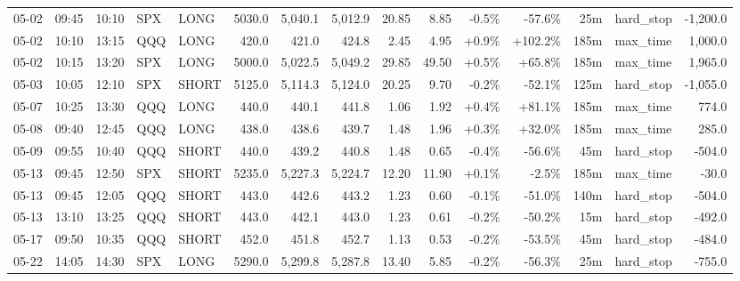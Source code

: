 \documentclass[11pt,a4paper,twoside]{article}
\begin{document}
\begin{landscape}
\begin{center}
\begin{longtable}{>{\color{txtmain}}l l l l l r r r r r r r r >{\color{txtmain}}l r}
05-02 & 09:45 & 10:10 & SPX & LONG & 5030.0 & 5,040.1 & 5,012.9 & 20.85 & 8.85 & \textcolor{lossred}{-0.5\%} & \textcolor{lossred}{-57.6\%} & 25m & hard\_stop & \textcolor{lossred}{-1,200.0} \\
05-02 & 10:10 & 13:15 & QQQ & LONG & 420.0 & 421.0 & 424.8 & 2.45 & 4.95 & \textcolor{wingreen}{+0.9\%} & \textcolor{wingreen}{+102.2\%} & 185m & max\_time & \textcolor{wingreen}{1,000.0} \\
05-02 & 10:15 & 13:20 & SPX & LONG & 5000.0 & 5,022.5 & 5,049.2 & 29.85 & 49.50 & \textcolor{wingreen}{+0.5\%} & \textcolor{wingreen}{+65.8\%} & 185m & max\_time & \textcolor{wingreen}{1,965.0} \\
05-03 & 10:05 & 12:10 & SPX & SHORT & 5125.0 & 5,114.3 & 5,124.0 & 20.25 & 9.70 & \textcolor{lossred}{-0.2\%} & \textcolor{lossred}{-52.1\%} & 125m & hard\_stop & \textcolor{lossred}{-1,055.0} \\
05-07 & 10:25 & 13:30 & QQQ & LONG & 440.0 & 440.1 & 441.8 & 1.06 & 1.92 & \textcolor{wingreen}{+0.4\%} & \textcolor{wingreen}{+81.1\%} & 185m & max\_time & \textcolor{wingreen}{774.0} \\
05-08 & 09:40 & 12:45 & QQQ & LONG & 438.0 & 438.6 & 439.7 & 1.48 & 1.96 & \textcolor{wingreen}{+0.3\%} & \textcolor{wingreen}{+32.0\%} & 185m & max\_time & \textcolor{wingreen}{285.0} \\
05-09 & 09:55 & 10:40 & QQQ & SHORT & 440.0 & 439.2 & 440.8 & 1.48 & 0.65 & \textcolor{lossred}{-0.4\%} & \textcolor{lossred}{-56.6\%} & 45m & hard\_stop & \textcolor{lossred}{-504.0} \\
05-13 & 09:45 & 12:50 & SPX & SHORT & 5235.0 & 5,227.3 & 5,224.7 & 12.20 & 11.90 & \textcolor{wingreen}{+0.1\%} & \textcolor{lossred}{-2.5\%} & 185m & max\_time & \textcolor{lossred}{-30.0} \\
05-13 & 09:45 & 12:05 & QQQ & SHORT & 443.0 & 442.6 & 443.2 & 1.23 & 0.60 & \textcolor{lossred}{-0.1\%} & \textcolor{lossred}{-51.0\%} & 140m & hard\_stop & \textcolor{lossred}{-504.0} \\
05-13 & 13:10 & 13:25 & QQQ & SHORT & 443.0 & 442.1 & 443.0 & 1.23 & 0.61 & \textcolor{lossred}{-0.2\%} & \textcolor{lossred}{-50.2\%} & 15m & hard\_stop & \textcolor{lossred}{-492.0} \\
05-17 & 09:50 & 10:35 & QQQ & SHORT & 452.0 & 451.8 & 452.7 & 1.13 & 0.53 & \textcolor{lossred}{-0.2\%} & \textcolor{lossred}{-53.5\%} & 45m & hard\_stop & \textcolor{lossred}{-484.0} \\
05-22 & 14:05 & 14:30 & SPX & LONG & 5290.0 & 5,299.8 & 5,287.8 & 13.40 & 5.85 & \textcolor{lossred}{-0.2\%} & \textcolor{lossred}{-56.3\%} & 25m & hard\_stop & \textcolor{lossred}{-755.0} \\

\end{longtable}
\end{center}
\end{landscape}
\end{document}
